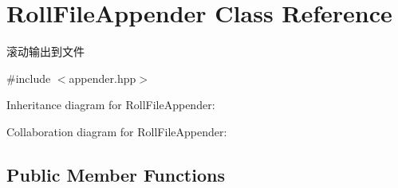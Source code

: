 \hypertarget{classRollFileAppender}{}\section{Roll\+File\+Appender Class Reference}
\label{classRollFileAppender}


滚动输出到文件  




{\ttfamily \#include $<$appender.\+hpp$>$}



Inheritance diagram for Roll\+File\+Appender\+:


Collaboration diagram for Roll\+File\+Appender\+:
\subsection*{Public Member Functions}
